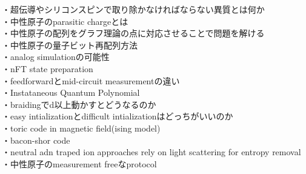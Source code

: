 \documentclass[a4paper,10.5pt]{ltjsarticle}
\begin{document}
\vspace{50pt}
・超伝導やシリコンスピンで取り除かなければならない異質とは何か\\
・中性原子のparasitic chargeとは\\
・中性原子の配列をグラフ理論の点に対応させることで問題を解ける\\
・中性原子の量子ビット再配列方法\\
・analog simulationの可能性\\
・nFT state preparation\\
・feedforwardとmid-circuit measurementの違い\\
・Instataneous Quantum Polynomial\\
・braidingでd以上動かすとどうなるのか\\
・easy intializationとdifficult intializationはどっちがいいのか\\
・toric code in magnetic field(ising model)\\
・bacon-shor code\\
・neutral adn traped ion approaches rely on light scattering for entropy removal\\
・中性原子のmeasurement freeなprotocol\\　
\\
\end{document}
